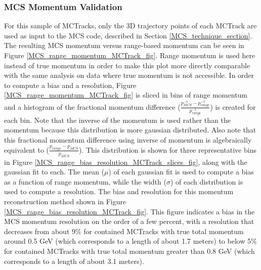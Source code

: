\subsubsection{MCS Momentum Validation}\label{MCS_Momentum_Validation_MCTrack_section}
For this sample of {\sc MCTracks}, only the 3D trajectory points of each {\sc MCTrack} are used as input to the MCS code, described in Section \ref{MCS_technique_section}. The resulting MCS momentum versus range-based momentum can be seen in Figure \ref{MCS_range_momentum_MCTrack_fig}. Range momentum is used here instead of true momentum in order to make this plot more directly comparable with the same analysis on data where true momentum is not accessible. In order to compute a bias and a resolution, Figure \ref{MCS_range_momentum_MCTrack_fig} is sliced in bins of range momentum and a histogram of the fractional momentum difference ($\frac{p_{MCS}^{-1} - p_{range}^{-1}}{p_{range}^{-1}}$) is created for each bin. Note that the inverse of the momentum is used rather than the momentum because this distribution is more gaussian distributed. Also note that this fractional momentum difference using inverse of momentum is algebraically equivalent to ($\frac{p_{range} - p_{MCS}}{p_{MCS}}$). This distribution is shown for three representative bins in Figure \ref{MCS_range_bias_resolution_MCTrack_slices_fig}, along with the gaussian fit to each.  The mean ($\mu$) of each gaussian fit is used to compute a bias as a function of range momentum, while the width ($\sigma$) of each distribution is used to compute a resolution. The bias and resolution for this momentum reconstruction method shown in Figure \ref{MCS_range_bias_resolution_MCTrack_fig}. This figure indicates a bias in the MCS momentum resolution on the order of a few percent, with a resolution that decreases from about 9\% for contained {\sc MCTracks} with true total momentum around 0.5 GeV (which corresponds to a length of about 1.7 meters) to below 5\% for contained {\sc MCTracks} with true total momentum greater than 0.8 GeV (which corresponds to a length of about 3.1 meters).


